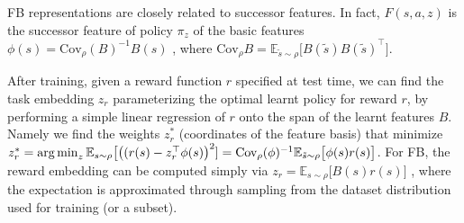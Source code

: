 FB representations are closely related to successor features. In fact, $F(s,a,z)$ is the successor feature of policy $\pi_z$ of the basic features $\phi(s)= \text{Cov}_{\rho}(B)^{-1}B(s)$ \citep{touati2023does}, where $\text{Cov}_{\rho}B=\mathbb{E}_{\tilde s\sim\rho}\big[B(\tilde s)B(\tilde s)^\top \big]$.

After training, given a reward function $r$ specified at test time, we can find the task embedding $z_r$ parameterizing the optimal learnt policy for reward $r$, by performing a simple linear regression of $r$ onto the span of the learnt features $B$. Namely we find the weights $z_r^*$ (coordinates of the feature basis) that minimize $z_r^* = \operatorname*{arg\,min}_z \mathbb E_{s\sim\rho}\big[ \big((r(s) - z_r^\top \phi(s)\big)^2] = \text{Cov}_{\rho}(\phi)^{-1} \mathbb{E}_{\tilde s\sim\rho}\big[\phi(s)r(s)\big]$. 
For FB, the reward embedding can be computed simply via $z_r = \mathbb{E}_{s\sim\rho}\big[B(s)r(s)\big]$ \citep{touati2021learning}, where the expectation is approximated through sampling from the dataset distribution used for training (or a subset).